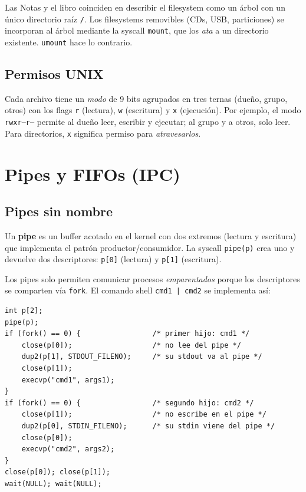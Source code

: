 \documentclass[11pt,a4paper]{article}
\begin{document}
Las Notas y el libro coinciden en describir el filesystem como un
árbol con un único directorio raíz \texttt{/}. Los filesystems
removibles (CDs, USB, particiones) se incorporan al árbol mediante la
syscall \texttt{mount}, que los \emph{ata} a un directorio existente.
\texttt{umount} hace lo contrario.

\subsection{Permisos UNIX}

Cada archivo tiene un \emph{modo} de 9 bits agrupados en tres
ternas (dueño, grupo, otros) con los flags \texttt{r} (lectura),
\texttt{w} (escritura) y \texttt{x} (ejecución). Por ejemplo, el modo
\texttt{rwxr--r--} permite al dueño leer, escribir y ejecutar; al
grupo y a otros, solo leer. Para directorios, \texttt{x} significa
permiso para \emph{atravesarlos}.

\section{Pipes y FIFOs (IPC)}

\subsection{Pipes sin nombre}

\begin{definicion}
Un \textbf{pipe} es un buffer acotado en el kernel con dos extremos
(lectura y escritura) que implementa el patrón productor/consumidor.
La syscall \texttt{pipe(p)} crea uno y devuelve dos descriptores:
\texttt{p[0]} (lectura) y \texttt{p[1]} (escritura).
\end{definicion}

Los pipes solo permiten comunicar procesos \emph{emparentados} porque
los descriptores se comparten vía \texttt{fork}. El comando shell
\texttt{cmd1 | cmd2} se implementa así:

\begin{lstlisting}[style=cstyle]
int p[2];
pipe(p);
if (fork() == 0) {                 /* primer hijo: cmd1 */
    close(p[0]);                   /* no lee del pipe */
    dup2(p[1], STDOUT_FILENO);     /* su stdout va al pipe */
    close(p[1]);
    execvp("cmd1", args1);
}
if (fork() == 0) {                 /* segundo hijo: cmd2 */
    close(p[1]);                   /* no escribe en el pipe */
    dup2(p[0], STDIN_FILENO);      /* su stdin viene del pipe */
    close(p[0]);
    execvp("cmd2", args2);
}
close(p[0]); close(p[1]);
wait(NULL); wait(NULL);
\end{lstlisting}
\end{document}
